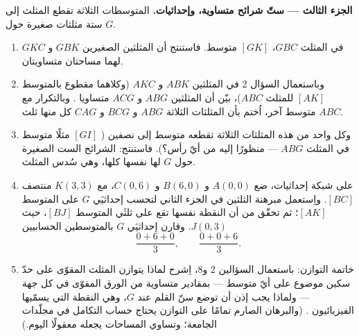 \begin{problem}
\medskip
\noindent\textbf{الجزء الثالث --- ستّ شرائح متساوية، وإحداثيات.}
المتوسطات الثلاثة تقطع المثلث إلى ستة مثلثات صغيرة
حول $G$.
\begin{enumerate}[resume]
  \item في المثلث $GBC$،  $[GK]$ متوسط.
        فاستنتج أن المثلثين الصغيرين $GBK$ و $GKC$ لهما
        مساحتان متساويتان.
  \item وباستعمال السؤال 2 في المثلثين $ABK$ و $AKC$ (وكلاهما
        مقطوع بالمتوسط $[AK]$ للمثلث $ABC$)، بيّن أن
        المثلثين $ABG$ و $ACG$ متساويا . وبالتكرار
        مع متوسط آخر، اُختم بأن المثلثات الثلاثة
        $ABG$ و $BCG$ و $CAG$  كل منها ثلث $ABC$.
  \item وكل واحد من هذه المثلثات الثلاثة تقطعه 
        متوسط إلى نصفين ( $[GI]$ مثلًا متوسط في
        المثلث $ABG$ --- منظورًا إليه من أيّ رأس؟). فاستنتج: الشرائح الست
        الصغيرة حول $G$ لها  نفسها كلها، وهي سُدس
        المثلث.
  \item على شبكة إحداثيات، ضع $A(0, 0)$ و $B(6, 0)$ و
        $C(0, 6)$، مع $K(3, 3)$ منتصف $[BC]$. واِستعمل
        مبرهنة الثلثين في الجزء الثاني لتحسب إحداثيَي
        $G$ على المتوسط $[AK]$؛ ثم تحقّق من أن النقطة
        نفسها تقع على ثلثَي المتوسط $[BJ]$، حيث
        $J(0, 3)$. وقارن إحداثيَي $G$ بالمتوسطين الحسابيين
        \[
        \frac{0 + 6 + 0}{3},
        \qquad
        \frac{0 + 0 + 6}{3} .
        \]
  \item خاتمة التوازن: باستعمال السؤالين 2 و8، اِشرح لماذا
        يتوازن المثلث المقوّى على حدّ سكين موضوع
        على أيّ متوسط --- بمقادير متساوية من الورق المقوّى في كل
        جهة --- ولماذا يجب إذن أن توضع سنّ القلم
        عند $G$، وهي النقطة التي يسمّيها الفيزيائيون . (والبرهان الصارم تمامًا على التوازن يحتاج
        حساب التكامل في مجلّدات الجامعة؛ وتساوي
        المساحات يجعله معقولًا اليوم.)
\end{enumerate}
\end{problem}
